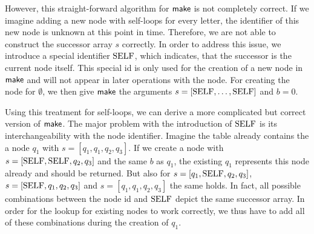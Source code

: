 However, this straight-forward algorithm for $\operatorname{\textsf{make}}$ is not completely correct. If we imagine adding a new node with self-loops for every letter, the identifier of this new node is unknown at this point in time. Therefore, we are not able to construct the successor array $s$ correctly. In order to address this issue, we introduce a special identifier $\mathrm{SELF}$, which indicates, that the successor is the current node itself. This special id is only used for the creation of a new node in $\operatorname{\textsf{make}}$ and will not appear in later operations with the node. 
For creating the node for $\emptyset$, we then give $\operatorname{\textsf{make}}$ the arguments $s = [\mathrm{SELF},\dots,\mathrm{SELF}]$ and $b = 0$.

\par

Using this treatment for self-loops, we can derive a more complicated but correct version of $\operatorname{\textsf{make}}$. The major problem with the introduction of $\mathrm{SELF}$ is its interchangeability with the node identifier. Imagine the table already contains the a node $q_{1}$ with $s=[q_{1},q_{1},q_{2},q_{3}]$. If we create a node with $s=[\mathrm{SELF},\mathrm{SELF},q_{2},q_{3}]$ and the same $b$ as $q_{1}$, the existing $q_{1}$ represents this node already and should be returned. But also for $s=[q_{1},\mathrm{SELF},q_{2},q_{3}]$, $s=[\mathrm{SELF},q_{1},q_{2},q_{3}]$ and $s=[q_{1},q_{1},q_{2},q_{3}]$ the same holds. In fact, all possible combinations between the node id and $\mathrm{SELF}$ depict the same successor array. In order for the lookup for existing nodes to work correctly, we thus have to add all of these combinations during the creation of $q_{1}$.

\par 

